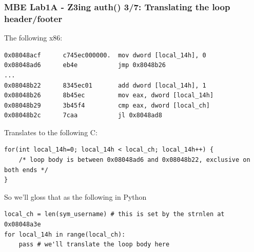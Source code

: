 \documentclass[aspectratio=169]{beamer}
\begin{document}
\begin{frame}[fragile]
\frametitle{MBE Lab1A - Z3ing auth() 3/7: Translating the loop header/footer}
The following x86:
\begin{Verbatim}[fontsize=\scriptsize, frame=single]
0x08048acf      c745ec000000.  mov dword [local_14h], 0
0x08048ad6      eb4e           jmp 0x8048b26
...
0x08048b22      8345ec01       add dword [local_14h], 1
0x08048b26      8b45ec         mov eax, dword [local_14h]
0x08048b29      3b45f4         cmp eax, dword [local_ch]
0x08048b2c      7caa           jl 0x8048ad8
\end{Verbatim}
Translates to the following C:
\begin{Verbatim}[fontsize=\scriptsize, frame=single]
for(int local_14h=0; local_14h < local_ch; local_14h++) {
    /* loop body is between 0x08048ad6 and 0x08048b22, exclusive on both ends */
}
\end{Verbatim}
So we'll gloss that as the following in Python
\begin{Verbatim}[fontsize=\scriptsize, frame=single]
local_ch = len(sym_username) # this is set by the strnlen at 0x08048a3e
for local_14h in range(local_ch):
    pass # we'll translate the loop body here
\end{Verbatim}
\end{frame}
\end{document}
